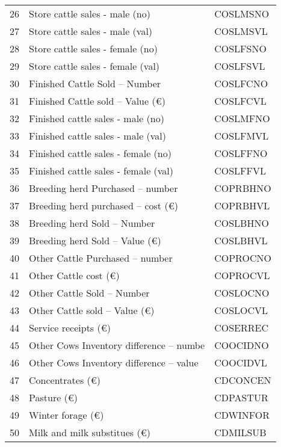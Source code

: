 \documentclass{article}\usepackage{graphicx, color}
\begin{document}
\begin{flushleft}
\begin{table}[ht]
\begin{center}
\begin{tabular}{rll}
  26 & Store cattle sales - male       (no) & COSLMSNO \\ 
  27 & Store cattle sales -  male      (val) & COSLMSVL \\ 
  28 & Store cattle sales - female     (no) & COSLFSNO \\ 
  29 & Store cattle sales - female     (val) & COSLFSVL \\ 
  30 & Finished Cattle Sold -- Number & COSLFCNO \\ 
  31 & Finished Cattle sold -- Value  (€) & COSLFCVL \\ 
  32 & Finished cattle sales - male    (no) & COSLMFNO \\ 
  33 & Finished cattle sales - male    (val) & COSLFMVL \\ 
  34 & Finished cattle sales - female  (no) & COSLFFNO \\ 
  35 & Finished cattle sales - female  (val) & COSLFFVL \\ 
  36 & Breeding herd Purchased -- number & COPRBHNO \\ 
  37 & Breeding herd purchased -- cost   (€) & COPRBHVL \\ 
  38 & Breeding herd Sold -- Number & COSLBHNO \\ 
  39 & Breeding herd Sold -- Value    (€) & COSLBHVL \\ 
  40 & Other Cattle Purchased -- number & COPROCNO \\ 
  41 & Other Cattle cost        (€) & COPROCVL \\ 
  42 & Other Cattle Sold -- Number & COSLOCNO \\ 
  43 & Other Cattle sold -- Value  (€) & COSLOCVL \\ 
  44 & Service receipts  (€) & COSERREC \\ 
  45 & Other Cows Inventory difference -- numbe & COOCIDNO \\ 
  46 & Other Cows Inventory difference -- value & COOCIDVL \\ 
  47 & Concentrates                 (€) & CDCONCEN \\ 
  48 & Pasture                      (€) & CDPASTUR \\ 
  49 & Winter forage                (€) & CDWINFOR \\ 
  50 & Milk and milk substitues     (€) & CDMILSUB \\ 
   \hline
\end{tabular}
\end{center}
\end{table}



\end{flushleft}
\end{document}
